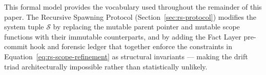 This formal model provides the vocabulary used throughout the remainder of this paper. The Recursive Spawning Protocol (Section~\ref{sec:rs-protocol}) modifies the system tuple $\mathcal{S}$ by replacing the mutable parent pointer and mutable scope functions with their immutable counterparts, and by adding the Fact Layer pre-commit hook and forensic ledger that together enforce the constraints in Equation~\ref{eq:rs-scope-refinement} as structural invariants — making the drift triad architecturally impossible rather than statistically unlikely.
